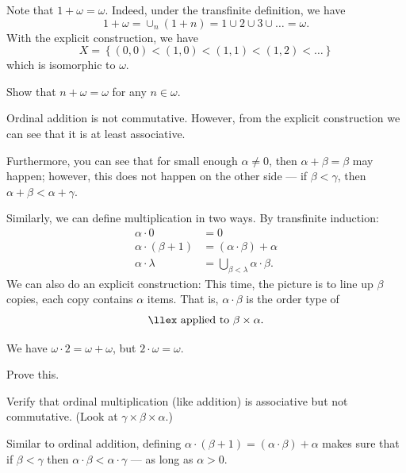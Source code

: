 \begin{example}
	Note that $1 + \omega = \omega$.
	Indeed, under the transfinite definition, we have
	\[ 1 + \omega = \cup_n (1+n) = 1 \cup 2 \cup 3 \cup \dots = \omega. \]
	With the explicit construction, we have
	\[ X = \left\{ (0,0) < (1,0) < (1,1) < (1,2) < \dots \right\} \]
	which is isomorphic to $\omega$.
\end{example}
\begin{exercise}
	Show that $n+\omega = \omega$ for any $n \in \omega$.
\end{exercise}

\begin{remark}
	Ordinal addition is not commutative.
	However, from the explicit construction
	we can see that it is at least associative.

	Furthermore, you can see that for small enough $\alpha \neq 0$,
	then $\alpha + \beta = \beta$ may happen; however, this does not happen on the other side --- if
	$\beta < \gamma$, then $\alpha + \beta < \alpha + \gamma$.
\end{remark}

Similarly, we can define multiplication in two ways.
By transfinite induction:
\begin{align*}
	\alpha \cdot 0 &= 0 \\
	\alpha \cdot (\beta + 1) &= (\alpha \cdot \beta) + \alpha \\
	\alpha \cdot \lambda &= \bigcup_{\beta < \lambda} \alpha \cdot \beta.
\end{align*}
We can also do an explicit construction:
This time, the picture is to line up $\beta$ copies, each copy contains $\alpha$ items.
That is, $\alpha \cdot \beta$ is the order type of
\[ \llex \text{ applied to } \beta \times \alpha. \]
\begin{example}
	We have $\omega \cdot 2 = \omega + \omega$,
	but $2 \cdot \omega = \omega$.
\end{example}
\begin{exercise}
	Prove this.
\end{exercise}
\begin{exercise}
	Verify that ordinal multiplication
	(like addition) is associative but not commutative.
	(Look at $\gamma \times \beta \times \alpha$.)
\end{exercise}

Similar to ordinal addition, defining $\alpha \cdot (\beta+1) = (\alpha \cdot \beta) + \alpha$ makes
sure that if $\beta < \gamma$ then $\alpha \cdot \beta < \alpha \cdot \gamma$ --- as long as $\alpha
> 0$.

